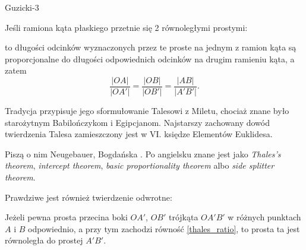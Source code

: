 %

Guzicki-3

\begin{theorem}[Talesa]
    Jeśli ramiona kąta płaskiego przetnie się 2 równoległymi prostymi:
    \begin{center}
        \end{center}
    to długości odcinków wyznaczonych przez te proste na jednym z ramion kąta są proporcjonalne do długości odpowiednich odcinków na drugim ramieniu kąta, a zatem
    \begin{equation}
        \label{thales_ratio}
        \frac{|OA|}{|OA'|} = \frac{|OB|}{|OB'|} = \frac{|AB|}{|A'B'|}.
    \end{equation}
\end{theorem}

Tradycja przypisuje jego sformułowanie Talesowi z Miletu, chociaż znane było starożytnym Babilończykom i Egipcjanom.
%
Najstarszy zachowany dowód twierdzenia Talesa zamieszczony jest w VI. księdze Elementów Euklidesa. 

Piszą o nim Neugebauer, Bogdańska \cite[s. 48-56]{neugebauer_2018}.
Po angielsku znane jest jako \emph{Thales's theorem}, \emph{intercept theorem}, \emph{basic proportionality theorem} albo \emph{side splitter theorem}.

Prawdziwe jest również twierdzenie odwrotne:

\begin{proposition}
    Jeżeli pewna prosta przecina boki $OA'$, $OB'$ trójkąta $OA'B'$ w różnych punktach $A$ i $B$ odpowiednio, a przy tym zachodzi równość \ref{thales_ratio}, to prosta ta jest równoległa do prostej $A'B'$.
\end{proposition}

